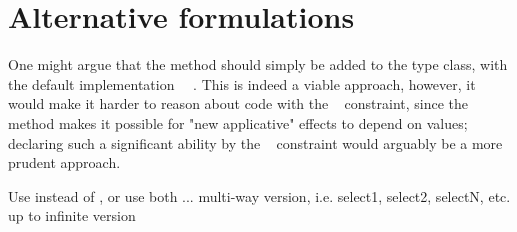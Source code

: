 \section{Alternative formulations}\label{sec-alternatives}

One might argue that the  method should simply be added to the
 type class, with the default implementation
~\hs{=}~. This is indeed a viable approach, however, it
would make it harder to reason about code with the ~
constraint, since the  method makes it possible for "new applicative"
effects to depend on values; declaring such a significant ability by the
~ constraint would arguably be a more prudent approach.

Use  instead of , or use both
...
multi-way version, i.e. select1, select2, selectN, etc. up to infinite version

